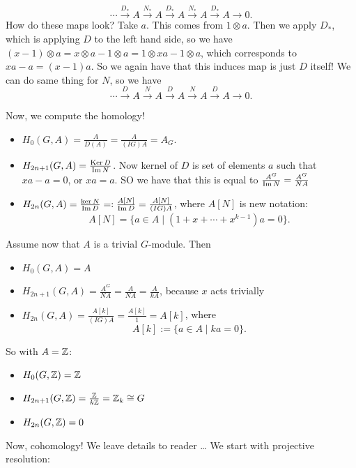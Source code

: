 \[
    \cdots
    \xrightarrow{D_*} A
    \xrightarrow{N_*} A
    \xrightarrow{D_*} A
    \xrightarrow{N_*} A
    \xrightarrow{D_*} A  \to  0
.\] 
How do these maps look?
Take $a$. This comes from  $1 \otimes a$. Then we apply $D_*$, which is applying  $D$ to the left hand side, so we have  $(x-1) \otimes a = x \otimes a - 1 \otimes a = 1\otimes xa - 1 \otimes a$, which corresponds to $xa - a = (x-1)a$.
So we again have that this induces map is just  $D$ itself!
We can do same thing for  $N$, so we have
\[
    \cdots
    \xrightarrow{D} A
    \xrightarrow{N} A
    \xrightarrow{D} A
    \xrightarrow{N} A
    \xrightarrow{D} A  \to  0
.\] 

Now, we compute the homology!
\begin{itemize}
    \item $H_0(G, A) = \frac{A}{D(A)} = \frac{A}{(IG)A} = A_G$.
    \item $H_{2n+1}(G, A) = \frac{\operatorname{Ker} D}{\operatorname{Im} N}$. Now kernel of $D$ is set of elements  $a$ such that  $xa -a = 0$, or $xa = a$. SO we have that this is equal to  $\frac{A^{G}}{ \operatorname{Im} N} = \frac{A^{G}}{NA}$
    \item $H_{2n}(G, A) = \frac{\ker N}{\operatorname{Im} D} =: \frac{A[N]}{\operatorname{Im} D} = \frac{A[N]}{(IG) A}$, where $A[N]$ is new notation:
         \[
             A[N] = \{ a \in  A  \mid (1+x + \cdots  + x^{k-1}) a = 0\} 
        .\] 
\end{itemize}

Assume now that $A$ is a trivial $G$-module.
Then 
\begin{itemize}
    \item $ H_0(G,A) = A$
    \item $H_{2n+1}(G, A) = \frac{A^{G}}{NA} = \frac{A}{NA} = \frac{A}{k A}$, because $x$ acts trivially
    \item  $H_{2n}(G, A) = \frac{A[k]}{(IG) A} = \frac{A[k]}{1} = A[k]$, where
        \[
            A[k] := \{ a \in A  \mid k a = 0\} 
        .\] 
\end{itemize}

So with $A = \mathbb{Z}$:
\begin{itemize}
    \item $ H_0(G, \mathbb{Z}) = \mathbb{Z}$
    \item $H_{2n+1}(G, \mathbb{Z}) = \frac{\mathbb{Z}}{k \mathbb{Z}} = \mathbb{Z}_k \cong G$
    \item $H_{2n}(G, \mathbb{Z}) = 0$
\end{itemize}

\hr

\hr

Now, cohomology! We leave details to reader \ldots
We start with projective resolution:

